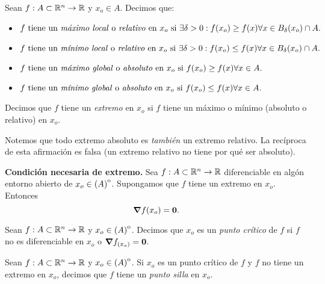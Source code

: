 \label{sec:extremos}

\begin{definition}  \label{def:extremos}
 \mbox{}
 
 Sean $f: A \subset \mathbb{R}^n \to \mathbb{R}$ y $x_o \in A$. Decimos que:
 \begin{itemize}
  \item $f \text{ tiene un \emph{m\'aximo local} o \emph{relativo} en } x_o \text{ si } \exists \delta > 0 : f(x_o) \ge f(x) \forall x \in B_{\delta}(x_o) \cap A.$ 
  \item $f \text{ tiene un \emph{m\'inimo local} o \emph{relativo} en } x_o \text{ si } \exists \delta > 0 : f(x_o) \le f(x) \forall x \in B_{\delta}(x_o) \cap A.$
  \item $f \text{ tiene un \emph{m\'aximo global} o \emph{absoluto} en } x_o \text{ si } f(x_o) \ge f(x) \forall x \in A.$ 
  \item $f \text{ tiene un \emph{m\'inimo global} o \emph{absoluto} en } x_o \text{ si } f(x_o) \le f(x) \forall x \in A.$
 \end{itemize}
 Decimos que $f$ tiene un \emph{extremo} en $x_o$ si $f$ tiene un m\'aximo o m\'inimo (absoluto o relativo) en $x_o$.
 \begin{obs}
  Notemos que todo extremo absoluto es \emph{tambi\'en} un extremo relativo. La rec\'iproca de esta afirmaci\'on es falsa (un extremo relativo no tiene por qu\'e ser absoluto).
 \end{obs}
\end{definition}

\begin{theorem}\textbf{Condici\'on necesaria de extremo.} \label{teo:grad_nulo}
 Sea $f: A \subset \mathbb{R}^n \to \mathbb{R}$ diferenciable en alg\'on entorno abierto de $x_o \in {\kern0pt(A)}^{\mathrm{o}}$. Supongamos que $f$ tiene un extremo en $x_o$. Entonces
 \[
  \grad f(x_o) = \mathbf{0}.
 \]
\end{theorem}

\begin{definition}  \label{def:pto_crit}
 Sean $f: A \subset \mathbb{R}^n \to \mathbb{R}$ y $x_o \in {\kern0pt(A)}^{\mathrm{o}}$. Decimos que $x_o$ es un \emph{punto cr\'itico} de $f$ si $f$ no es diferenciable en $x_o$ o $\grad f_{(x_o)} = \mathbf{0}$.
\end{definition}

\begin{definition}  \label{def:pto_silla}
 Sean $f: A \subset \mathbb{R}^n \to \mathbb{R}$ y $x_o \in {\kern0pt(A)}^{\mathrm{o}}$. Si $x_o$ es un punto cr\'itico de $f$ y $f$ no tiene un extremo en $x_o$, decimos que $f$ tiene un \emph{punto silla} en $x_o$.
\end{definition}



